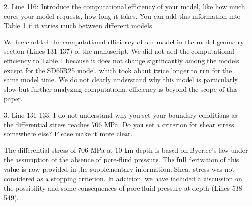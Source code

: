 \documentclass[12pt]{article}
\begin{document}
\begin{response}{2. Line 116: Introduce the computational efficiency of your model, like how much cores your model requests, how long it takes. You can add this information into Table 1 if it varies much between different models.}

  We have added the computational efficiency of our model in the model geometry section (Lines 131-137) of the manuscript. We did not add the computational efficiency to Table 1 because it does not change significantly among the models except for the SD65R25 model, which took about twice longer to run for the same model time. We do not clearly understand why this model is particularly slow but further analyzing computational efficiency is beyond the scope of this paper.
  
\end{response}


\begin{response}{3. Line 131-133: I do not understand why you set your boundary conditions as the differential stress reaches 706 MPa. Do you set a criterion for shear stress somewhere else? Please make it more clear.}

  The differential stress of 706 MPa at 10 km depth is based on Byerlee's law under the assumption of  
  the absence of pore-fluid pressure. The full derivation of this value is now provided in the supplementary information. Shear stress was not considered as a stopping criterion. In addition, we have included a discussion on the possibility and some consequences of pore-fluid pressure at depth (Lines 538-549).
  
\end{response}
\end{document}
